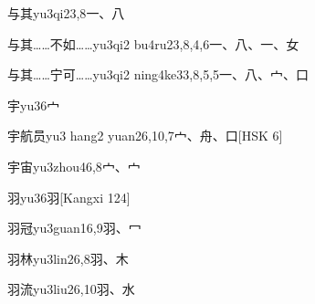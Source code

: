 \begin{EntryWithPhonetic}{与其}{yu3qi2}{3,8}{⼀、⼋}
\end{EntryWithPhonetic}

\begin{EntryWithPhonetic}{与其……不如……}{yu3qi2 bu4ru2}{3,8,4,6}{⼀、⼋、⼀、⼥}
\end{EntryWithPhonetic}

\begin{EntryWithPhonetic}{与其……宁可……}{yu3qi2 ning4ke3}{3,8,5,5}{⼀、⼋、⼧、⼝}
\end{EntryWithPhonetic}

\begin{EntryWithPhonetic}{宇}{yu3}{6}{⼧}
\end{EntryWithPhonetic}

\begin{EntryWithPhonetic}{宇航员}{yu3 hang2 yuan2}{6,10,7}{⼧、⾈、⼝}[HSK 6]
\end{EntryWithPhonetic}

\begin{EntryWithPhonetic}{宇宙}{yu3zhou4}{6,8}{⼧、⼧}
\end{EntryWithPhonetic}

\begin{EntryWithPhonetic}{羽}{yu3}{6}{⽻}[Kangxi 124]
\end{EntryWithPhonetic}

\begin{EntryWithPhonetic}{羽冠}{yu3guan1}{6,9}{⽻、⼍}
\end{EntryWithPhonetic}

\begin{EntryWithPhonetic}{羽林}{yu3lin2}{6,8}{⽻、⽊}
\end{EntryWithPhonetic}

\begin{EntryWithPhonetic}{羽流}{yu3liu2}{6,10}{⽻、⽔}
\end{EntryWithPhonetic}

